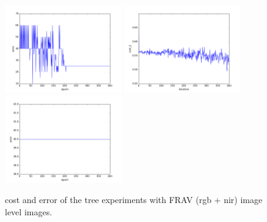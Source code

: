 \begin{figure}[htb]
\includegraphics[width=0.45\textwidth]{images/redes/ejecucion1/general_svm_frav_rgb_nir/minidataset_tested_itself/error.png}
\includegraphics[width=0.45\textwidth]{images/redes/ejecucion1/general_svm_frav_rgb_nir/minidataset_tested_iteself_lr_0_001/cost.png}
\includegraphics[width=0.45\textwidth]{images/redes/ejecucion1/general_svm_frav_rgb_nir/minidataset_tested_iteself_lr_0_001/error.png}
\caption{cost and error of the tree experiments with FRAV (rgb + nir) image level images.} \label{fig:frav_imagelevel-ejec1}
\end{figure}



